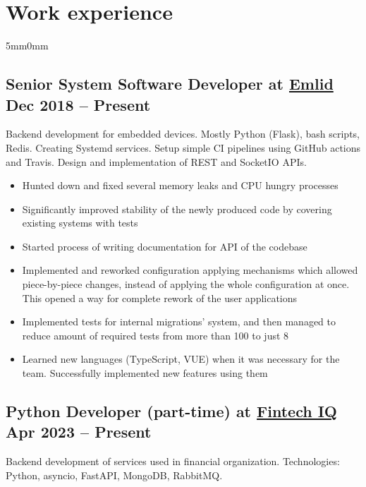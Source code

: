 \documentclass[10pt]{article}
\newcommand{\lmvalue}{5mm}
\newcommand{\rmvalue}{0mm}
\begin{document}
    \section*{Work experience}
    \begin{changemargin}{\lmvalue}{\rmvalue}
        \subsection*{Senior System Software Developer at \href{https://emlid.com}{Emlid}
        \hfill {\color{gray}Dec 2018 – Present}}

        Backend development for embedded devices.
        Mostly Python (Flask), bash scripts, Redis.
        Creating Systemd services.
        Setup simple CI pipelines using GitHub actions and Travis.
        Design and implementation of REST and SocketIO APIs.
        \begin{itemize}
            \item Hunted down and fixed several memory leaks and CPU hungry
            processes
            \item Significantly improved stability of the newly produced
            code by covering existing systems with tests
            \item Started process of writing documentation for API of the
            codebase
            \item Implemented and reworked configuration applying
            mechanisms which allowed piece-by-piece changes, instead of applying the whole
            configuration at once.
            This opened a way for complete rework of the user applications
            \item Implemented tests for internal migrations' system, and
            then managed to reduce amount of required tests from more than 100 to just 8
            \item Learned new languages (TypeScript, VUE) when it was necessary for the team.
            Successfully implemented new features using them
        \end{itemize}

		\subsection*{Python Developer (part-time) at \href{https://www.linkedin.com/company/fintech-iq/}{Fintech IQ}
		\hfill {\color{gray}Apr 2023 – Present}}

		Backend development of services used in financial organization.
		Technologies: Python, asyncio, FastAPI, MongoDB, RabbitMQ.


\end{changemargin}
\end{document}
